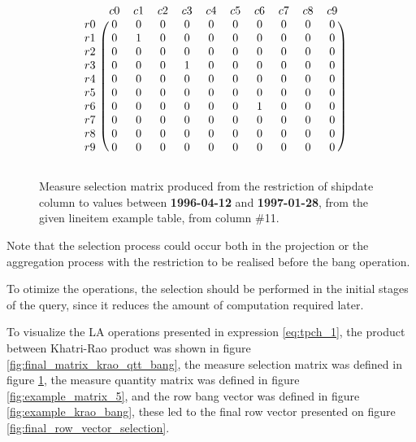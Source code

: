  \begin{figure}[H]
\centering
\caption{Measure selection matrix produced from the restriction of shipdate column to values between  \textbf{1996-04-12} and \textbf{1997-01-28}, from the given lineitem example table, from column \#11.}
\[
\begin{blockarray}{ccccccccccc}
		& c	0	& c	1	& c	2	& c	3	& c	4	& c	5	& c	6	& c	7	& c	8	& c	9	\\
\begin{block}{c(cccccccccc)}
r	0	&	0	&	0	&	0	&	0	&	0	&	0	&	0	&	0	&	0	&	0	\\
r	1	&	0	&	1	&	0	&	0	&	0	&	0	&	0	&	0	&	0	&	0	\\
r	2	&	0	&	0	&	0	&	0	&	0	&	0	&	0	&	0	&	0	&	0	\\
r	3	&	0	&	0	&	0	&	1	&	0	&	0	&	0	&	0	&	0	&	0	\\
r	4	&	0	&	0	&	0	&	0	&	0	&	0	&	0	&	0	&	0	&	0	\\
r	5	&	0	&	0	&	0	&	0	&	0	&	0	&	0	&	0	&	0	&	0	\\
r	6	&	0	&	0	&	0	&	0	&	0	&	0	&	1	&	0	&	0	&	0	\\
r	7	&	0	&	0	&	0	&	0	&	0	&	0	&	0	&	0	&	0	&	0	\\
r	8	&	0	&	0	&	0	&	0	&	0	&	0	&	0	&	0	&	0	&	0	\\
r	9	&	0	&	0	&	0	&	0	&	0	&	0	&	0	&	0	&	0	&	0	\\
\end{block}
\end{blockarray}
\]
\label{fig:example_restriction}
\end{figure}

Note that the selection process could occur both in the projection or the aggregation process with the restriction to be realised before the  bang operation. 

To otimize the operations, the selection should be performed in the initial stages of the query, since it reduces the amount of computation required later.\par 
 
To visualize the LA operations presented in expression \ref{eq:tpch_1}, the product between Khatri-Rao product was shown in figure \ref{fig:final_matrix_krao_qtt_bang}, the measure selection matrix was defined in figure \ref{fig:example_restriction}, the measure quantity matrix was defined in figure \ref{fig:example_matrix_5}, and the row bang vector was defined in figure \ref{fig:example_krao_bang}, these led to the final row vector presented on figure \ref{fig:final_row_vector_selection}.

